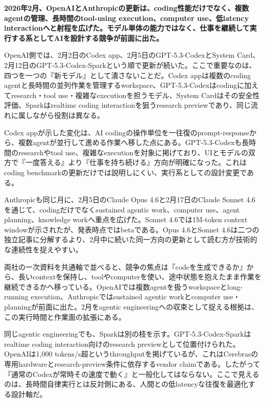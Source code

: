 \noindent\textbf{2026年2月、OpenAIとAnthropicの更新は、coding性能だけでなく、複数agentの管理、長時間のtool-using execution、computer use、低latency interactionへと射程を広げた。モデル単体の能力ではなく、仕事を継続して実行する系としてAIを設計する競争が前面に出た。}\autocite{src-15823ae5556e,src-9aba7995b6a5,src-f6aa679babd7}

OpenAI側では、2月2日のCodex app、2月5日のGPT-5.3-CodexとSystem Card、2月12日のGPT-5.3-Codex-Sparkという順で更新が続いた。ここで重要なのは、四つを一つの『新モデル』として潰さないことだ。Codex appは複数のcoding agentと長時間の並列作業を管理するworkspace、GPT-5.3-Codexはcodingに加えてresearch・tool use・複雑なexecutionを担うモデル、System Cardはその安全性評価、Sparkはrealtime coding interactionを狙うresearch previewであり、同じ流れに属しながら役割は異なる。\autocite{src-15823ae5556e,src-4a841ea7ec7c,src-9aba7995b6a5,src-dd64fe3084a4}


Codex appが示した変化は、AI codingの操作単位を一往復のprompt-responseから、複数agentが並行して進める作業へ移した点にある。GPT-5.3-Codexも長時間のresearchやtool use、複雑なexecutionを対象に掲げており、UIとモデルの双方で『一度答える』より『仕事を持ち続ける』方向が明確になった。これはcoding benchmarkの更新だけでは説明しにくい、実行系としての設計変更である。\autocite{src-15823ae5556e,src-9aba7995b6a5}


Anthropicも同じ月に、2月5日のClaude Opus 4.6と2月17日のClaude Sonnet 4.6を通じて、codingだけでなくsustained agentic work、computer use、agent planning、knowledge workへ重点を広げた。Sonnet 4.6では1M-token context windowが示されたが、発表時点ではbetaである。Opus 4.6とSonnet 4.6は二つの独立記事に分解するより、2月中に続いた同一方向の更新として読む方が技術的な連続性を捉えやすい。\autocite{src-f6aa679babd7}


両社の一次資料を共通軸で並べると、競争の焦点は『codeを生成できるか』から、長いcontextを保持し、toolやcomputerを使い、途中状態を抱えたまま作業を継続できるかへ移っている。OpenAIでは複数agentを扱うworkspaceとlong-running execution、Anthropicではsustained agentic workとcomputer use・planningが前面に出た。2月をagentic engineeringへの収束として捉える根拠は、この実行時間と作業面の拡張にある。\autocite{src-15823ae5556e,src-9aba7995b6a5,src-f6aa679babd7}


同じagentic engineeringでも、Sparkは別の枝を示す。GPT-5.3-Codex-Sparkはrealtime coding interaction向けのresearch previewとして位置付けられた。OpenAIは1,000 tokens/s超というthroughputを掲げているが、これはCerebrasの専用hardwareとresearch-preview条件に依存するvendor claimである。したがって『通常のCodexが常時その速度で動く』と一般化してはならない。ここで見えるのは、長時間自律実行とは反対側にある、人間との低latencyな往復を最適化する設計軸だ。\autocite{src-15823ae5556e,src-4a841ea7ec7c,src-9aba7995b6a5,src-dd64fe3084a4}


